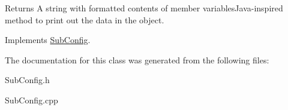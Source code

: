 \begin{DoxyReturn}{Returns}
A string with formatted contents of member variables\+Java-\/inspired method to print out the data in the object. 
\end{DoxyReturn}


Implements \hyperlink{classSubConfig_aaaef674182db54e8d13eec1456e1ab5b}{Sub\+Config}.



The documentation for this class was generated from the following files\+:\begin{DoxyCompactItemize}
\item 
Sub\+Config.\+h\item 
Sub\+Config.\+cpp\end{DoxyCompactItemize}
